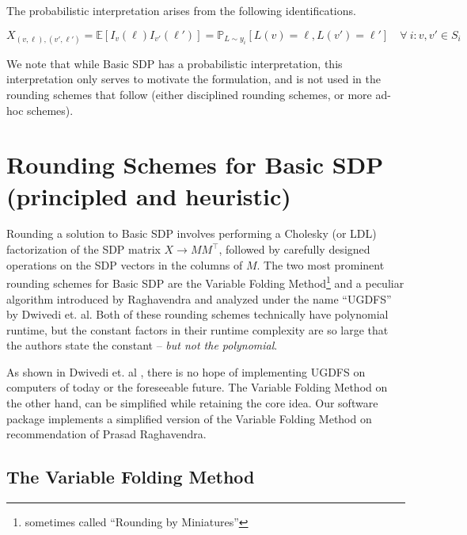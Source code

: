 \documentclass[12pt]{article} %
\begin{document}
The probabilistic interpretation arises from the following identifications.

\begin{equation}
X_{(v,\ell),(v',\ell')} = \mathbb{E}[I_v(\ell)I_{v'}(\ell')] = \mathbb{P}_{L\sim y_i}[L(v)=\ell, L(v')=\ell'] \quad \forall ~ i : v,v' \in S_i
\end{equation}

We note that while Basic SDP has a probabilistic interpretation, this interpretation only serves to motivate the formulation, and is not used in the rounding schemes that follow (either disciplined rounding schemes, or more ad-hoc schemes).

\section{Rounding Schemes for Basic SDP (principled and heuristic)}

Rounding a solution to Basic SDP involves performing a Cholesky (or LDL) factorization of the SDP matrix $X \rightarrow MM^{\intercal} $, followed by carefully designed operations on the SDP vectors in the columns of $M$. The two most prominent rounding schemes for Basic SDP are the Variable Folding Method\footnote{sometimes called ``Rounding by Miniatures''} \cite{raghavendra2009round} and a peculiar algorithm introduced by Raghavendra \citep{raghavendra2008optimal} and analyzed under the name ``UGDFS'' by Dwivedi et. al\cite{dwivedi2015introduction}. Both of these rounding schemes technically have polynomial runtime, but the constant factors in their runtime complexity are so large that the authors state the constant -- \textit{but not the polynomial}.

As shown in Dwivedi et. al \cite{dwivedi2015introduction}, there is no hope of implementing UGDFS on computers of today or the foreseeable future. The Variable Folding Method on the other hand, can be simplified while retaining the core idea. Our software package implements a simplified version of the Variable Folding Method on recommendation of Prasad Raghavendra. 

\subsection{The Variable Folding Method}
\end{document}

